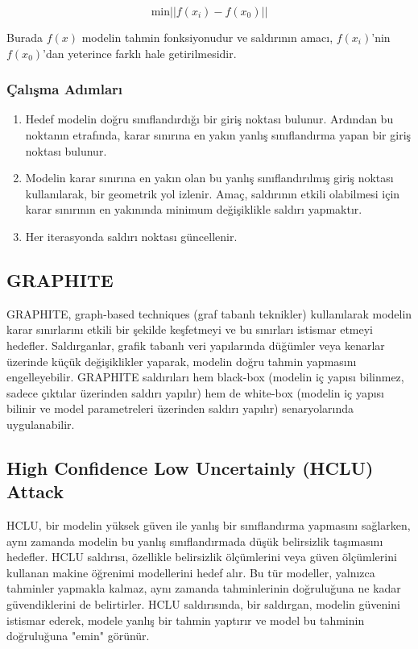 \[ \text{min} || f(x_i) - f(x_0) || \]

Burada $f(x)$ modelin tahmin fonksiyonudur ve saldırının amacı, $f(x_i)$'nin $f(x_0)$'dan yeterince farklı hale getirilmesidir.

\subsubsection{Çalışma Adımları}

\begin{enumerate}
    \item Hedef modelin doğru sınıflandırdığı bir giriş noktası bulunur. Ardından bu noktanın etrafında, karar sınırına en yakın yanlış sınıflandırma yapan bir giriş noktası bulunur.
    \item Modelin karar sınırına en yakın olan bu yanlış sınıflandırılmış giriş noktası kullanılarak, bir geometrik yol izlenir. Amaç, saldırının etkili olabilmesi için karar sınırının en yakınında minimum değişiklikle saldırı yapmaktır.
    \item Her iterasyonda saldırı noktası güncellenir.
\end{enumerate}

\newpage

\subsection{GRAPHITE}

GRAPHITE, graph-based techniques (graf tabanlı teknikler) kullanılarak modelin karar sınırlarını etkili bir şekilde keşfetmeyi ve bu sınırları istismar etmeyi hedefler. Saldırganlar, grafik tabanlı veri yapılarında düğümler veya kenarlar üzerinde küçük değişiklikler yaparak, modelin doğru tahmin yapmasını engelleyebilir. GRAPHITE saldırıları hem black-box (modelin iç yapısı bilinmez, sadece çıktılar üzerinden saldırı yapılır) hem de white-box (modelin iç yapısı bilinir ve model parametreleri üzerinden saldırı yapılır) senaryolarında uygulanabilir.

\newpage

\subsection{High Confidence Low Uncertainly (HCLU) Attack}

HCLU, bir modelin yüksek güven ile yanlış bir sınıflandırma yapmasını sağlarken, aynı zamanda modelin bu yanlış sınıflandırmada düşük belirsizlik taşımasını hedefler. HCLU saldırısı, özellikle belirsizlik ölçümlerini veya güven ölçümlerini kullanan makine öğrenimi modellerini hedef alır. Bu tür modeller, yalnızca tahminler yapmakla kalmaz, aynı zamanda tahminlerinin doğruluğuna ne kadar güvendiklerini de belirtirler. HCLU saldırısında, bir saldırgan, modelin güvenini istismar ederek, modele yanlış bir tahmin yaptırır ve model bu tahminin doğruluğuna "emin" görünür.

